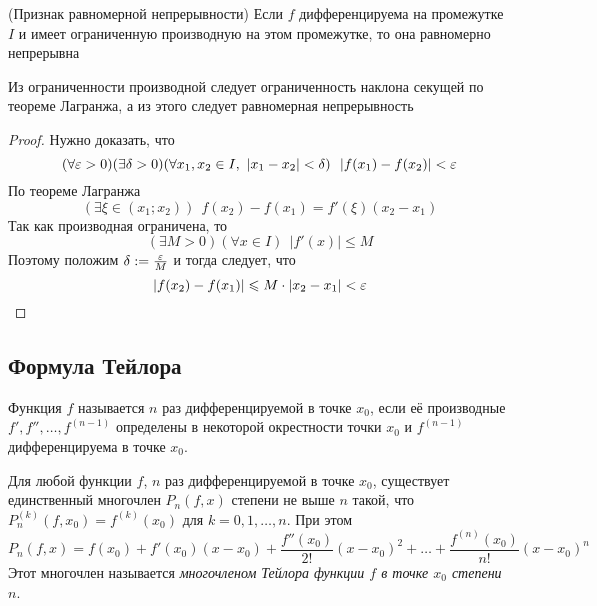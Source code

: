 \begin{theorem} (Признак равномерной непрерывности)
	Если $f$ дифференцируема на промежутке $I$ и имеет
	ограниченную производную на этом промежутке, то она
	равномерно непрерывна 
\end{theorem}

\begin{idea}
	Из ограниченности производной следует ограниченность наклона
	секущей по теореме Лагранжа, а из этого следует
	равномерная непрерывность
\end{idea}

\begin{proof}
	Нужно доказать, что
	\[
		(\forall \varepsilon > 0)(\exists \delta > 0)
		(\forall x_1, x_2 \in I,\ |x_1 - x_2| < \delta)
		\ \ |f(x_1) - f(x_2)| < \varepsilon
	\]
	По теореме Лагранжа
	\[
		(\exists \xi \in (x_1; x_2))\ \ 
		f(x_2) - f(x_1) = f'(\xi)(x_2 - x_1)
	\]
	Так как производная ограничена, то
	\[
		(\exists M > 0)(\forall x \in I)
		\ \ |f'(x)| \le M
	\]
	Поэтому положим $\delta := \frac{\varepsilon}{M}$ и
	тогда следует, что
	\[
		|f(x_2) - f(x_1)| \leqslant M \cdot |x_2 - x_1| < \varepsilon
	\]
\end{proof}



\subsection{Формула Тейлора}


\begin{definition}
	Функция $f$ называется $n$ раз дифференцируемой в точке
	$x_0$, если её производные $f', f'', \ldots, f^{(n - 1)}$
	определены в некоторой окрестности точки $x_0$ и $f^{(n - 1)}$
	дифференцируема в точке $x_0$.
\end{definition}

\begin{lemma}
	Для любой функции $f$, $n$ раз дифференцируемой в точке
	$x_0$, существует единственный многочлен $P_n(f, x)$
	степени не выше $n$ такой, что $P_n^{(k)}(f, x_0) =
	f^{(k)}(x_0)$ для $k = 0, 1, \ldots, n$. При этом
	\[
		P_n(f, x) = f(x_0) + f'(x_0)(x - x_0) +
		\frac{f''(x_0)}{2!}(x - x_0)^2 + \ldots +
		\frac{f^{(n)}(x_0)}{n!}(x - x_0)^n
 	\]
 	Этот многочлен называется \textit{многочленом Тейлора
	функции $f$ в точке $x_0$ степени $n$}.
\end{lemma}

